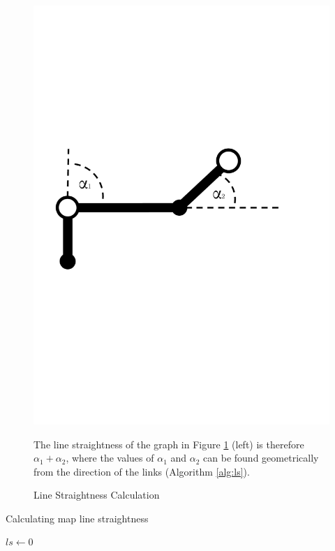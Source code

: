 \begin{figure}[h]
\centering
\hspace{-0.5cm}\begin{minipage}{.5\textwidth}
  \centering\includegraphics[width=.8\linewidth]{img/implementation/linestraightness.pdf}\caption{Line Straightness Calculation\label{fig:linestraightness}}
  \end{minipage}\hspace{0.5cm}\begin{minipage}{.5\textwidth}
The line straightness of the graph in Figure \ref{fig:linestraightness} (left) is therefore $\alpha_1 + \alpha_2$, where the values of $\alpha_1$ and $\alpha_2$ can be found geometrically from the direction of the links (Algorithm \ref{alg:ls}).
\end{minipage}
\end{figure}

\begin{algorithm}
\label{alg:ls}
 \caption{Calculating map line straightness}
 $ls \gets 0$ \;
\end{algorithm}

